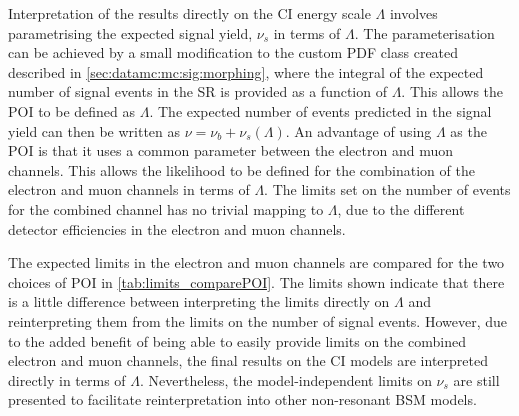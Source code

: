 Interpretation of the results directly on the CI energy scale $\Lambda$ involves parametrising the expected signal yield, $\nu_s$ in terms of $\Lambda$. The parameterisation can be achieved by a small modification to the custom PDF class created described in \cref{sec:datamc:mc:sig:morphing}, where the integral of the expected number of signal events in the SR is provided as a function of $\Lambda$. This allows the POI to be defined as $\Lambda$. The expected number of events predicted in the signal yield can then be written as $\nu = \nu_b +\nu_s(\Lambda)$. An advantage of using $\Lambda$ as the POI is that it uses a common parameter between the electron and muon channels. This allows the likelihood to be defined for the combination of the electron and muon channels in terms of $\Lambda$. The limits set on the number of events for the combined channel has no trivial mapping to $\Lambda$, due to the different detector efficiencies in the electron and muon channels.  

The expected limits in the electron and muon channels are compared for the two choices of POI in \cref{tab:limits_comparePOI}. The limits shown indicate that there is a little difference between interpreting the limits directly on $\Lambda$ and reinterpreting them from the limits on the number of signal events. However, due to the added benefit of being able to easily provide limits on the combined electron and muon channels, the final results on the CI models are interpreted directly in terms of $\Lambda$. Nevertheless, the model-independent limits on $\nu_s$ are still presented to facilitate reinterpretation into other non-resonant BSM models. 

